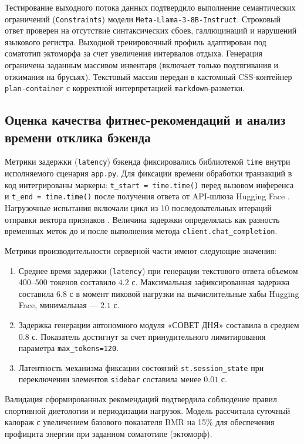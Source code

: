 \documentclass[14pt, a4paper]{extarticle}
\begin{document}
Тестирование выходного потока данных подтвердило выполнение семантических ограничений (\texttt{Constraints}) модели \texttt{Meta-Llama-3-8B-Instruct}. Строковый ответ проверен на отсутствие синтаксических сбоев, галлюцинаций и нарушений языкового регистра. Выходной тренировочный профиль адаптирован под соматотип эктоморфа за счет увеличения интервалов отдыха. Генерация ограничена заданным массивом инвентаря (включает только подтягивания и отжимания на брусьях). Текстовый массив передан в кастомный CSS-контейнер \texttt{plan-container} с корректной интерпретацией \texttt{markdown}-разметки.

\subsection{Оценка качества фитнес-рекомендаций и анализ времени отклика бэкенда}

Метрики задержки (\texttt{latency}) бэкенда фиксировались библиотекой \texttt{time} внутри исполняемого сценария \texttt{app.py}. Для фиксации времени обработки транзакций в код интегрированы маркеры: \texttt{t\_start = time.time()} перед вызовом инференса и \texttt{t\_end = time.time()} после получения ответа от API-шлюза \cite{json_spec} Hugging Face \cite{app.py}. Нагрузочные испытания включали цикл из 10 последовательных итераций отправки вектора признаков \cite{stat_methods}. Величина задержки определялась как разность временных меток до и после выполнения метода \texttt{client.chat\_completion}.

Метрики производительности серверной части имеют следующие значения:
\begin{enumerate}
    \item Среднее время задержки (\texttt{latency}) при генерации текстового ответа объемом 400--500 токенов составило $4.2$ с. Максимальная зафиксированная задержка составила $6.8$ с в момент пиковой нагрузки на вычислительные хабы Hugging Face, минимальная --- $2.1$ с.
    \item Задержка генерации автономного модуля «СОВЕТ ДНЯ» составила в среднем $0.8$ с. Показатель достигнут за счет принудительного лимитирования параметра \texttt{max\_tokens=120}.
    \item Латентность механизма фиксации состояний \texttt{st.session\_state} при переключении элементов \texttt{sidebar} составила менее $0.01$ с.
\end{enumerate}

Валидация сформированных рекомендаций подтвердила соблюдение правил спортивной диетологии и периодизации нагрузок. Модель рассчитала суточный калораж с увеличением базового показателя BMR на 15\% для обеспечения профицита энергии при заданном соматотипе (эктоморф).
\end{document}
